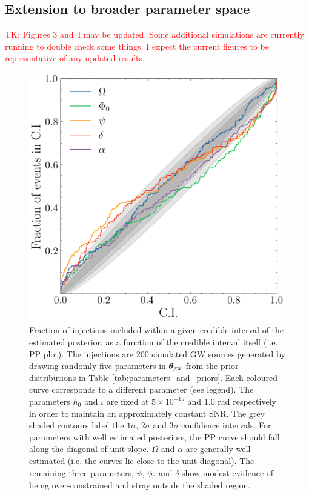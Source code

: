 \documentclass[fleqn,usenatbib,useAMS]{mnras}
\begin{document}
\subsection{Extension to broader parameter space} \label{sec:parameter_space}
\textcolor{red}{TK: Figures 3 and 4 may be updated. Some additional simulations are currently running to double check some things. I expect the current figures to be representative of any updated results.} \newline 
\begin{figure}
	\centering
	\includegraphics[width=\columnwidth]{images/pp_plot_canonical500}
	\caption{Fraction of injections included within a given credible interval of the estimated posterior, as a function of the credible interval itself (i.e. PP plot). The injections are 200 simulated GW sources generated by drawing randomly five parameters in $\boldsymbol{\theta}_{\rm gw}$ from the prior distributions in Table \ref{tab:parameters_and_priors}. Each coloured curve corresponds to a different parameter (see legend). The parameters $h_0$ and $\iota$ are fixed at $5 \times 10^{-15}$ and 1.0 rad respectively in order to maintain an approximately constant SNR. The grey shaded contours label the $1\sigma$, $2\sigma$ and 3$\sigma$ confidence intervals. For parameters with well estimated posteriors, the PP curve should fall along the diagonal of unit slope. $\Omega$ and $\alpha$ are generally well-estimated (i.e. the curves lie close to the unit diagonal). The remaining three parameters, $\psi$, $\phi_0$ and $\delta$ show modest evidence of being over-constrained and stray outside the shaded region.}
	\label{fig:parameter_space}
\end{figure}
\end{document}

